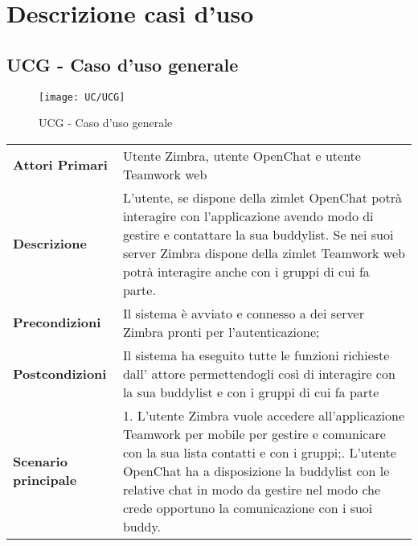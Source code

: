 \appendix
	\chapter{Descrizione casi d'uso} \label{A1}
\section{UCG - Caso d'uso generale}
\begin{figure}[H] 
	\centering
	\texttt{[image: UC/UCG]}
	\caption{UCG - Caso d'uso generale}
\end{figure}
\begin{center}
	\bgroup
	\def\arraystretch{1.8}     
	\begin{longtable}{  p{4cm} | p{9.5cm} } 
		\textbf{Attori Primari} & Utente Zimbra, utente OpenChat e utente Teamwork web \\ 
		\textbf{Descrizione} & L'utente, se dispone della zimlet OpenChat potrà interagire con l'applicazione avendo modo di gestire e contattare la sua buddylist. Se nei suoi server Zimbra dispone della zimlet Teamwork web potrà interagire anche con i gruppi di cui fa parte. \\ 
		\textbf{Precondizioni}  & Il sistema è avviato e connesso a dei server Zimbra pronti per l'autenticazione; \\
		\textbf{Postcondizioni} & Il sistema ha eseguito tutte le funzioni richieste dall' attore permettendogli così di interagire con la sua buddylist e con i gruppi di cui fa parte  \\ 
		\textbf{Scenario principale} & 
		1. L’utente Zimbra vuole accedere all'applicazione Teamwork per mobile per gestire e comunicare con la sua lista contatti e con i gruppi;\newline
		2. L’utente OpenChat ha a disposizione la buddylist con le relative chat in modo da gestire nel modo che crede opportuno la comunicazione con i suoi buddy.
	\end{longtable}
	\egroup
\end{center}

